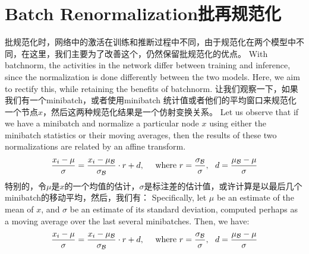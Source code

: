 \section{Batch Renormalization批再规范化}
批规范化时，网络中的激活在训练和推断过程中不同，由于规范化在两个模型中不同，在这里，我们主要为了改善这个，仍然保留批规范化的优点。
With batchnorm, the activities in the network differ between training and inference, since the normalization is done differently between the two models. Here, we aim to rectify this, while retaining  the benefits of batchnorm.
让我们观察一下，如果我们有一个minibatch，或者使用minibatch 统计值或者他们的平均窗口来规范化一个节点$x$，然后这两种规范化结果是一个仿射变换关系。
Let us observe that if we have a minibatch and normalize a particular node  $x$ using either the minibatch statistics or their moving averages, then the results of these two normalizations are related by an affine transform.
$$
\frac{x_i-\mu}{\sigma} = \frac{x_i-\mu_{\mathcal{B}}}{\sigma_{\mathcal{B}}} \cdot r + d,\ \ \ \ \text{where $ r = \frac{\sigma_{\mathcal{B}}}{\sigma}, \ \  d = \frac{\mu_{\mathcal{B}}-\mu}{\sigma}$}
$$
特别的，令$\mu$是$x$的一个均值的估计，$\sigma$是标注差的估计值，或许计算是以最后几个minibatch的移动平均，然后，我们有：
Specifically, let $\mu$ be an estimate of the mean of $x$, and $\sigma$ be an estimate of its standard deviation, computed perhaps as a moving average over the last several minibatches. Then, we have:
$$
\frac{x_i-\mu}{\sigma} = \frac{x_i-\mu_{\mathcal{B}}}{\sigma_{\mathcal{B}}} \cdot r + d,\ \ \ \ \text{where $ r = \frac{\sigma_{\mathcal{B}}}{\sigma}, \ \  d = \frac{\mu_{\mathcal{B}}-\mu}{\sigma}$}
$$

